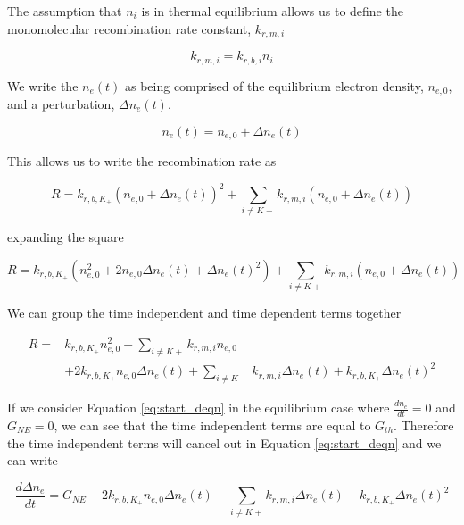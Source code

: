 The assumption that $n_i$ is in thermal equilibrium allows us to define the monomolecular recombination rate constant, $k_{r, m, i}$ 

\begin{equation}
\label{eq:monomolecular_recombination}
k_{r, m, i} = k_{r, b, i}n_{i}
\end{equation}


We write the $n_{e}(t)$ as being comprised of the equilibrium electron density, \(n_{e,0}\), and a perturbation, \(\Delta n_{e}(t)\).

\begin{equation}
  \label{eq:ne_pert}
n_{e}(t) = n_{e,0} + \Delta n_{e}(t)
\end{equation}

This allows us to write the recombination rate as

\begin{equation}
R = k_{r, b, K_{+}}(n_{e,0} + \Delta n_{e}(t))^2 + \sum_{i \neq K+}^{}k_{r, m, i}(n_{e,0} + \Delta n_{e}(t))
\end{equation}

expanding the square

\begin{equation}
R = k_{r, b, K_{+}}(n_{e,0}^2 + 2n_{e,0}\Delta n_{e}(t) + \Delta n_{e}(t)^2) + \sum_{i \neq K+}^{}k_{r, m, i}(n_{e,0} + \Delta n_{e}(t))
\end{equation}

We can group the time independent and time dependent terms together

\begin{align}
R = & k_{r, b, K_{+}}n_{e,0}^2 + \sum_{i \neq K+}^{}k_{r, m, i}n_{e,0} \nonumber \\
    & + 2k_{r, b, K_{+}}n_{e,0}\Delta n_{e}(t) + \sum_{i \neq K+}^{}k_{r, m, i} \Delta n_{e}(t) + k_{r, b, K_{+}}\Delta n_{e}(t)^2 
\end{align}

If we consider Equation \ref{eq:start_deqn} in the equilibrium case where $\frac{dn_{e}}{dt} = 0$ and $G_{NE} = 0$, we can see that the time independent terms are equal to $G_{th}$. Therefore the time independent terms will cancel out in Equation \ref{eq:start_deqn} and we can write

\begin{equation}
\frac{d\Delta n_{e}}{dt} = G_{NE}  -  2k_{r, b, K_{+}}n_{e,0}\Delta n_{e}(t) - \sum_{i \neq K+}^{}k_{r, m, i} \Delta n_{e}(t)- k_{r, b, K_{+}}\Delta n_{e}(t)^2
\end{equation}

